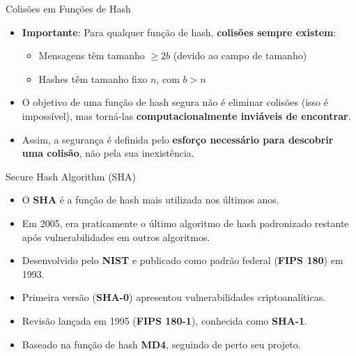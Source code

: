 \begin{frame}{Colisões em Funções de Hash}
    \begin{itemize}
        \item \textbf{Importante}: Para qualquer função de hash, \textbf{colisões sempre existem}:
        \begin{itemize}
            \item Mensagens têm tamanho $\ge 2b$ (devido ao campo de tamanho)  
            \item Hashes têm tamanho fixo $n$, com $b > n$
        \end{itemize}
        \item O objetivo de uma função de hash segura não é eliminar colisões (isso é impossível),  
        mas torná-las \textbf{computacionalmente inviáveis de encontrar}.
        \item Assim, a segurança é definida pelo \textbf{esforço necessário para descobrir uma colisão}, não pela sua inexistência.
    \end{itemize}
\end{frame}

\begin{frame}{Secure Hash Algorithm (SHA)}
    \begin{itemize}
        \item O \textbf{SHA} é a função de hash mais utilizada nos últimos anos.
        \item Em 2005, era praticamente o último algoritmo de hash padronizado restante após vulnerabilidades em outros algoritmos.
        \item Desenvolvido pelo \textbf{NIST} e publicado como padrão federal (\textbf{FIPS 180}) em 1993.
        \item Primeira versão (\textbf{SHA-0}) apresentou vulnerabilidades criptoanalíticas.
        \item Revisão lançada em 1995 (\textbf{FIPS 180-1}), conhecida como \textbf{SHA-1}.
        \item Baseado na função de hash \textbf{MD4}, seguindo de perto seu projeto.
    \end{itemize}
\end{frame}

